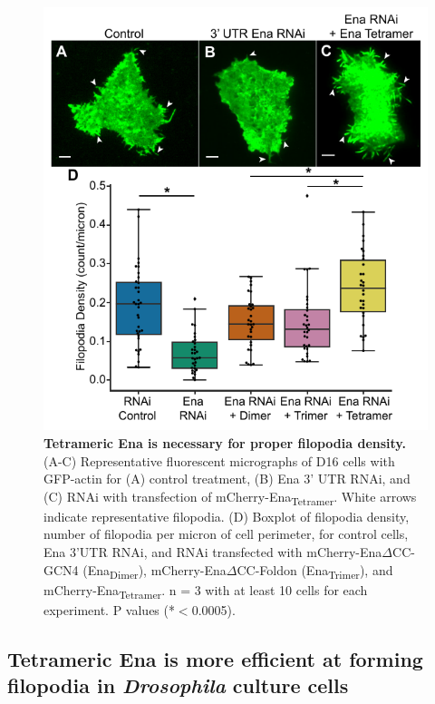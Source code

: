 \begin{figure}
\centering
\includegraphics[width=5in]{img/ch02/Figure_4_elife.pdf}
\caption[Tetrameric Ena is necessary for proper filopodia density.]{\textbf{Tetrameric Ena is necessary for proper filopodia density.} (A-C) Representative fluorescent micrographs of D16 cells with GFP-actin for (A) control treatment, (B) Ena 3' UTR RNAi, and (C) RNAi with transfection of mCherry-Ena\textsubscript{Tetramer}. White arrows indicate representative filopodia. (D) Boxplot of filopodia density, number of filopodia per micron of cell perimeter, for control cells, Ena 3'UTR RNAi, and RNAi transfected with mCherry-Ena$\Delta$CC-GCN4 (Ena\textsubscript{Dimer}), mCherry-Ena$\Delta$CC-Foldon (Ena\textsubscript{Trimer}), and mCherry-Ena\textsubscript{Tetramer}. n = 3 with at least 10 cells for each experiment. P values (*$<$0.0005).}
\label{fig:ena-cells}
\end{figure}

\subsection{Tetrameric Ena is more efficient at forming filopodia in \textit{Drosophila} culture cells}\label{ena-fly-cells}

